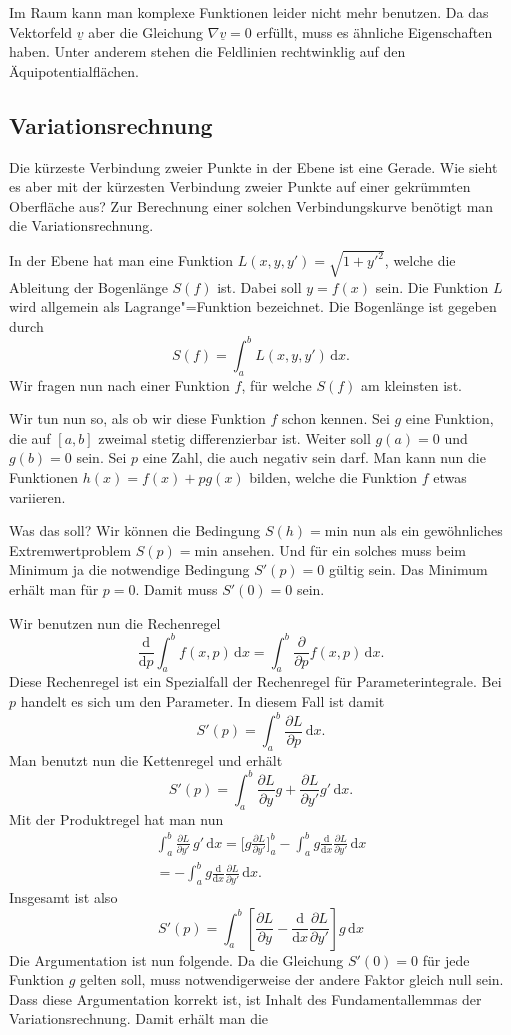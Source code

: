 \documentclass[a4paper,10pt,fleqn,twocolumn,twoside]{article}
\begin{document}
Im Raum kann man komplexe Funktionen leider nicht mehr benutzen.
Da das Vektorfeld $\underline v$ aber die Gleichung
$\nabla\underline v=0$ erfüllt, muss es ähnliche Eigenschaften
haben. Unter anderem stehen die Feldlinien rechtwinklig auf den
Äquipotentialflächen.


\subsection{Variationsrechnung}

Die kürzeste Verbindung zweier Punkte in der Ebene ist eine Gerade.
Wie sieht es aber mit der kürzesten Verbindung zweier Punkte auf
einer gekrümmten Oberfläche aus? Zur Berechnung einer solchen
Verbindungskurve benötigt man die Variationsrechnung.

In der Ebene hat man eine Funktion $L(x,y,y') = \sqrt{1+y'^2}$,
welche die Ableitung der Bogenlänge $S(f)$ ist. Dabei soll
$y=f(x)$ sein. Die Funktion $L$ wird allgemein als
Lagrange"=Funktion bezeichnet. Die Bogenlänge ist gegeben durch
\[S(f) = \int_a^b L(x,y,y')\,\mathrm dx.\]
Wir fragen nun nach einer Funktion $f$, für welche $S(f)$ am
kleinsten ist.

Wir tun nun so, als ob wir diese Funktion $f$ schon kennen.
Sei $g$ eine Funktion, die auf $[a,b]$ zweimal stetig
differenzierbar ist. Weiter soll $g(a)=0$ und $g(b)=0$
sein. Sei $p$ eine Zahl, die auch negativ sein darf. Man
kann nun die Funktionen $h(x)=f(x)+pg(x)$ bilden, welche
die Funktion $f$ etwas variieren.

Was das soll? Wir können die Bedingung $S(h)=\mathrm{min}$ nun als
ein gewöhnliches Extremwertproblem $S(p)=\mathrm{min}$ ansehen.
Und für ein solches muss beim Minimum ja die notwendige Bedingung
$S'(p)=0$ gültig sein. Das Minimum erhält man für $p=0$.
Damit muss $S'(0)=0$ sein.

Wir benutzen nun die Rechenregel
\[\frac{\mathrm d}{\mathrm dp}\int_a^b f(x,p)\,\mathrm dx =
\int_a^b \frac{\partial}{\partial p}f(x,p)\,\mathrm dx.\]
Diese Rechenregel ist ein Spezialfall der Rechenregel für
Parameterintegrale. Bei $p$ handelt es sich um den Parameter.
In diesem Fall ist damit
\[S'(p) = \int_a^b \frac{\partial L}{\partial p}\,\mathrm dx.\]
Man benutzt nun die Kettenregel und erhält
\[S'(p) = \int_a^b \frac{\partial L}{\partial y}g
  +\frac{\partial L}{\partial y'}g'\,\mathrm dx.\]
Mit der Produktregel hat man nun
\begin{gather*}
\int_a^b \frac{\partial L}{\partial y'}\,g'\,\mathrm dx
= \Big[g\frac{\partial L}{\partial y'}\Big]_a^b
- \int_a^b g \frac{\mathrm d}{\mathrm dx}
\frac{\partial L}{\partial y'}\,\mathrm dx\\
= - \int_a^b g \frac{\mathrm d}{\mathrm dx}
\frac{\partial L}{\partial y'}\,\mathrm dx.
\end{gather*}
Insgesamt ist also
\[S'(p) = \int_a^b \left[\frac{\partial L}{\partial y}
-\frac{\mathrm d}{\mathrm dx}\frac{\partial L}{\partial y'}
\right]g\,\mathrm dx\]
Die Argumentation ist nun folgende. Da die Gleichung $S'(0)=0$
für jede Funktion $g$ gelten soll, muss notwendigerweise der andere
Faktor gleich null sein. Dass diese Argumentation korrekt ist, ist
Inhalt des Fundamentallemmas der Variationsrechnung.
Damit erhält man die
\end{document}
